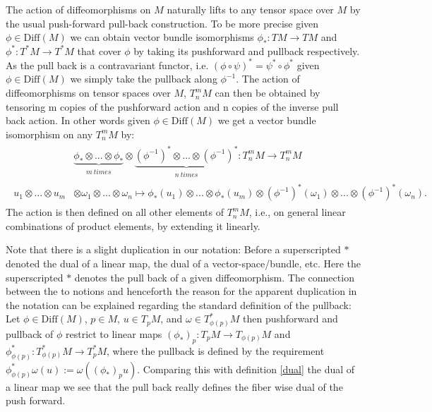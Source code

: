 \documentclass[a4paper,12pt, DIV=14, BCOR=5mm, twoside, headsepline, numbers=noenddot]{scrbook}
\begin{document}
The action of diffeomorphisms on $M$ naturally lifts to any tensor space over $M$ by the usual push-forward pull-back construction. To be more precise given $\phi \in \mathrm{Diff}(M)$ we can obtain vector bundle isomorphisms $\phi_{\ast} : TM \rightarrow TM $ and $\phi^{\ast} : T^{\ast}M \rightarrow T^{\ast}M$ that cover $\phi$ by taking its pushforward and pullback respectively. As the pull back is a contravariant functor, i.e. $(\phi \circ \psi)^{\ast}=\psi^{\ast}\circ \phi^{\ast}$ given $\phi \in \mathrm{Diff}(M)$ we simply take the pullback along $\phi^{-1}$. The action of diffeomorphisms on tensor spaces over $M$, $T^m_nM$ can then be obtained by tensoring m copies of the pushforward action and n copies of the inverse pull back action. In other words given $\phi \in \mathrm{Diff}(M)$ we get a vector bundle isomorphism on any $T^m_nM$ by:
\begin{align}
\begin{aligned}
    &\underbrace{\phi_{\ast} \otimes ... \otimes \phi_{\ast}}_{\substack{m \  times}} \otimes \underbrace{(\phi^{-1})^{\ast} \otimes ... \otimes (\phi^{-1})^{\ast} }_{\substack{n \  times}} : T^m_nM \longrightarrow T^m_nM \\
    u_1 \otimes ... \otimes u_m &\otimes \omega_1 \otimes ... \otimes \omega_n \longmapsto \phi_{\ast} (u_1) \otimes ... \otimes \phi_{\ast}(u_m) \otimes (\phi^{-1})^{\ast}(\omega_1) \otimes ... \otimes (\phi^{-1})^{\ast}(\omega_n).
\end{aligned}
\end{align}
The action is then defined on all other elements of $T^m_nM$, i.e., on general linear combinations of product elements, by extending it linearly.

Note that there is a slight duplication in our notation: Before a superscripted $\ast$ denoted the dual of a linear map, the dual of a vector-space/bundle, etc. Here the superscripted $\ast$ denotes the pull back of a given diffeomorphism. The connection between the to notions and henceforth the reason for the apparent duplication in the notation can be explained regarding the standard definition of the pullback: Let $\phi \in \mathrm{Diff}(M)$, $p \in M$, $u \in T_pM$, and  $\omega \in T^{\ast}_{\phi(p)}M$ then pushforward and pullback of $\phi$ restrict to linear maps $(\phi_{\ast}) _p :  T_pM \rightarrow T_{\phi(p)}M$ and $\phi^{\ast}_{\phi(p)} : T^{\ast}_{\phi(p)}M \rightarrow T^{\ast}_pM$, where the pullback is defined by the requirement $\phi^{\ast}_{\phi(p)}\omega (u) := \omega ((\phi_{\ast})_p u)$. Comparing this with definition \ref{dual} the dual of a linear map we see that the pull back really defines the fiber wise dual of the push forward. 
\end{document}
